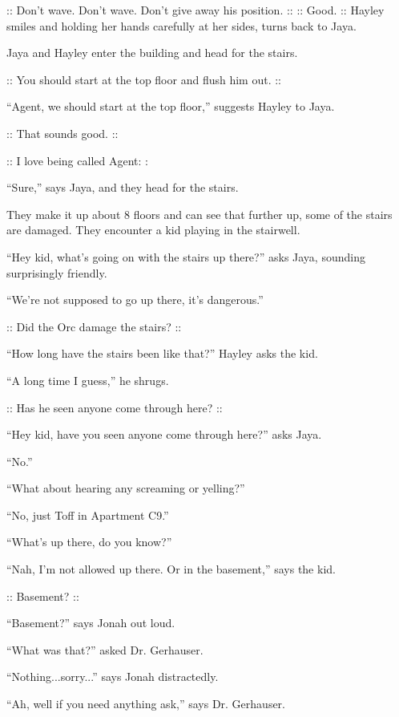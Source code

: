 :: {\color[RGB]{230,145,56}Don't wave. Don't wave.  Don't give away his position.} ::  :: {\color[RGB]{106,168,79}Good.} ::  Hayley smiles and holding her hands carefully at her sides, turns back to Jaya.



Jaya and Hayley enter the building and head for the stairs.

:: {\color[RGB]{106,168,79}You should start at the top floor and flush him out.} ::

``Agent, we should start at the top floor,'' suggests Hayley to Jaya.

:: {\color[RGB]{60,120,216}That sounds good.} ::

:: {\color[RGB]{204,0,0}I love being called Agent:} : 

``Sure,'' says Jaya, and they head for the stairs.



They make it up about 8 floors and can see that further up, some of the stairs are damaged.  They encounter a kid playing in the stairwell.

``Hey kid, what's going on with the stairs up there?'' asks Jaya, sounding surprisingly friendly.

``We're not supposed to go up there, it's dangerous.''

:: {\color[RGB]{106,168,79}Did the Orc damage the stairs?} ::

``How long have the stairs been like that?'' Hayley asks the kid.

``A long time I guess,'' he shrugs.

:: {\color[RGB]{60,120,216}Has he seen anyone come through here?} ::

``Hey kid, have you seen anyone come through here?'' asks Jaya.

``No.''

``What about hearing any screaming or yelling?''

``No, just Toff in Apartment C9.''

``What's up there, do you know?''

``Nah, I'm not allowed up there.  Or in the basement,'' says the kid.

:: {\color[RGB]{60,120,216}Basement?} ::

``Basement?'' says Jonah out loud.  

``What was that?'' asked Dr. Gerhauser.

``Nothing...sorry...'' says Jonah distractedly.

``Ah, well if you need anything ask,'' says Dr. Gerhauser.



